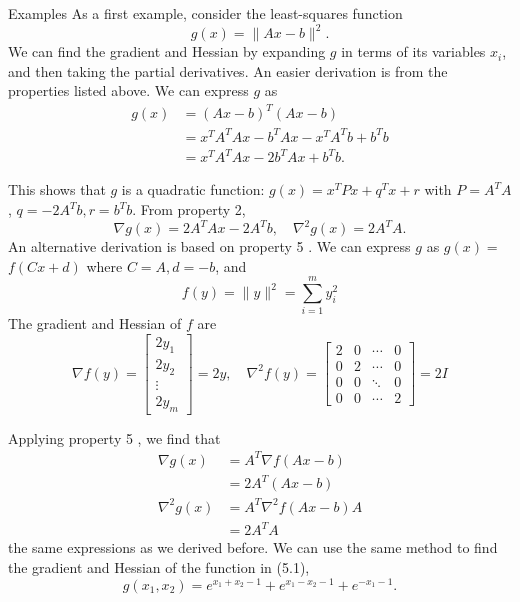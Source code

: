 \begin{example}
    Examples As a first example, consider the least-squares function
\begin{equation}
g(x)=\|A x-b\|^{2} .
\end{equation}
We can find the gradient and Hessian by expanding $ g $ in terms of its variables $ x_{i} $, and then taking the partial derivatives. An easier derivation is from the properties listed above. We can express $ g $ as
\begin{equation}
\begin{aligned}
g(x) &=(A x-b)^{T}(A x-b) \\
&=x^{T} A^{T} A x-b^{T} A x-x^{T} A^{T} b+b^{T} b \\
&=x^{T} A^{T} A x-2 b^{T} A x+b^{T} b .
\end{aligned}
\end{equation}

This shows that $ g $ is a quadratic function: $ g(x)=x^{T} P x+q^{T} x+r $ with $ P=A^{T} A $, $ q=-2 A^{T} b, r=b^{T} b . $ From property 2,
\begin{equation}
\nabla g(x)=2 A^{T} A x-2 A^{T} b, \quad \nabla^{2} g(x)=2 A^{T} A .
\end{equation}
An alternative derivation is based on property 5 . We can express $ g $ as $ g(x)= $ $ f(C x+d) $ where $ C=A, d=-b $, and
\begin{equation}
f(y)=\|y\|^{2}=\sum_{i=1}^{m} y_{i}^{2}
\end{equation}
The gradient and Hessian of $ f $ are
\begin{equation}
\nabla f(y)=\left[\begin{array}{c}
2 y_{1} \\
2 y_{2} \\
\vdots \\
2 y_{m}
\end{array}\right]=2 y, \quad \nabla^{2} f(y)=\left[\begin{array}{cccc}
2 & 0 & \cdots & 0 \\
0 & 2 & \cdots & 0 \\
0 & 0 & \ddots & 0 \\
0 & 0 & \cdots & 2
\end{array}\right]=2 I
\end{equation}

Applying property 5 , we find that
\begin{equation}
\begin{aligned}
\nabla g(x) &=A^{T} \nabla f(A x-b) \\
&=2 A^{T}(A x-b) \\
\nabla^{2} g(x) &=A^{T} \nabla^{2} f(A x-b) A \\
&=2 A^{T} A
\end{aligned}
\end{equation}
the same expressions as we derived before.
We can use the same method to find the gradient and Hessian of the function in (5.1),
\begin{equation}
g\left(x_{1}, x_{2}\right)=e^{x_{1}+x_{2}-1}+e^{x_{1}-x_{2}-1}+e^{-x_{1}-1} .
\end{equation}


\end{example}
